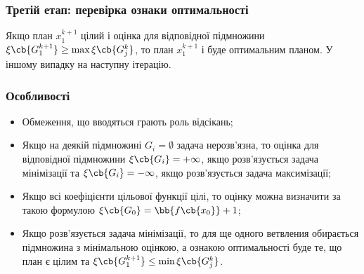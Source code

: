 \subsubsection{Третій етап: перевірка ознаки оптимальності}
Якщо план $x_1^{k+1}$ цілий і оцінка для відповідної підмножини $\xi\cb{G_1^{k+1}} \geq \max\xi\cb{G_j^k}$, то план $x_1^{k+1}$ і буде оптимальним планом. У іншому випадку на наступну ітерацію.
\subsubsection{Особливості}
\begin{itemize}
\item Обмеження, що вводяться грають роль відсікань;
\item Якщо на деякій підмножині $G_i=\emptyset$ задача нерозв’язна, то оцінка для відповідної підмножини $\xi\cb{G_i}=+\infty$, якщо розв’язується задача мінімізації та  $\xi\cb{G_i}=-\infty$, якщо розв'язується задача максимізації;
\item Якщо всі коефіцієнти цільової функції цілі, то оцінку можна визначити за такою формулою $\xi\cb{G_0} = \bb{f\cb{x_0}}+1$;
\item Якщо розв’язується задача мінімізації, то для ще одного ветвления обирається підмножина з мінімальною оцінкою, а ознакою оптимальності буде те, що план є цілим та $\xi\cb{G_1^{k+1}} \leq \min\xi\cb{G_j^k}$.
\end{itemize}
